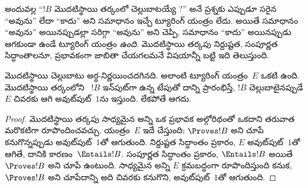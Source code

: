 \documentclass[../../../include/open-logic-section]{subfiles}
\begin{document}
\begin{explain}
అందువల్ల ``$!B$ మొదటిస్థాయి తర్కంలో చెల్లుబాటయ్యే
?'' అనే ప్రశ్నకు ఎప్పుడూ సరైన ``అవును'' లేదా
``కాదు'' అని సమాధానం ఇచ్చే ట్యూరింగ్ యంత్రం లేదు. అయితే సమాధానం ``అవును''
అయినప్పుడల్లా సరిగ్గా ``అవును'' అని చెప్పి, సమాధానం ``కాదు'' అయినప్పుడు
ఆగకుండా ఉండే ట్యూరింగ్ యంత్రం \emph{ఉంది}. మొదటిస్థాయి తర్కపు నిర్దుష్టత,
సంపూర్ణత సిద్ధాంతాలనూ,  ప్రభావకంగా జాబితా
చేయగలమనే విషయాన్నీ బట్టి ఇది తెలుస్తుంది.
\end{explain}

\begin{thm}
  మొదటిస్థాయి  చెల్లుబాటు అర్ధ-నిర్ణయించదగినది.
  అలాంటి ట్యూరింగ్ యంత్రం~$E$ ఒకటి ఉంది. మొదటిస్థాయి తర్కంలోని
  ~$!B$ ఇన్‌పుట్‌గా ఉన్న టేపుతో దాన్ని ప్రారంభిస్తే,
  $!B$ చెల్లుబాటైనప్పుడే $E$ చివరకు ఆగి అవుట్‌పుట్~$1$ను ఇస్తుంది.
  లేకపోతే ఆగదు.
\end{thm}

\begin{proof}
  మొదటిస్థాయి తర్కపు సాధ్యమైన అన్ని  ఒక ప్రభావక
అల్గోరిథంతో ఒకదాని తరువాత మరొకటిగా రూపొందించవచ్చు. యంత్రం~$E$ ఇదే
  చేస్తుంది; $\Proves !B$ అని చూపే  కనుగొన్నప్పుడు
  అవుట్‌పుట్~$1$తో ఆగుతుంది. నిర్దుష్టత సిద్ధాంతం ప్రకారం, $E$ అవుట్‌పుట్~$1$తో
  ఆగితే, దానికి కారణం~$\Entails !B$. సంపూర్ణత సిద్ధాంతం ప్రకారం,
  $\Entails !B$ అయితే $\Proves !B$ అని చూపే  ఉంటుంది.
సాధ్యమైన అన్ని  $E$ క్రమబద్ధంగా రూపొందిస్తుంది కనుక,
  $\Proves !B$ అని చూపేదాన్ని అది చివరకు కనుగొని, అవుట్‌పుట్~$1$తో ఆగుతుంది.
\end{proof}
\end{document}
